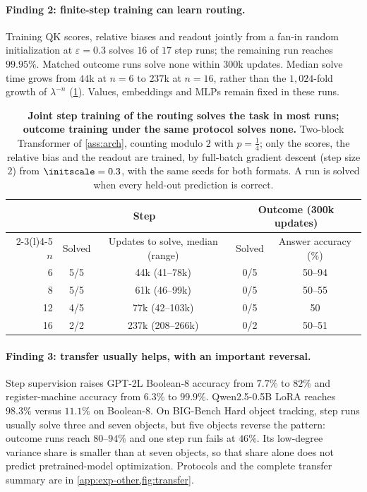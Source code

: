 \paragraph{Finding 2: finite-step training can learn routing.}
Training QK scores, relative biases and readout jointly from a fan-in random initialization
at $\varepsilon=0.3$ solves $16$ of $17$ step runs; the remaining run reaches $99.95\%$.
Matched outcome runs solve none within $300$k updates. Median solve time grows from
$44$k at $n=6$ to $237$k at $n=16$, rather than the $1{,}024$-fold growth of $\lambda^{-n}$
(\cref{tab:reach}). Values, embeddings and MLPs remain fixed in these runs.

\begin{table}[t]
\caption{\textbf{Joint step training of the routing solves the task in most runs; outcome training under the same protocol solves
none.} Two-block Transformer of \cref{ass:arch}, counting modulo $2$ with $p=\tfrac{1}{4}$; only the scores, the relative bias and the
readout are trained, by full-batch gradient descent (step size $2$) from $\initscale=0.3$, with the same seeds for both formats. A run is
solved when every held-out prediction is correct.}
\label{tab:reach}
\centering\small
\begin{tabular}{@{}rcccc@{}}
\toprule
 & \multicolumn{2}{c}{Step} & \multicolumn{2}{c}{Outcome (300k updates)}\\
\cmidrule(lr){2-3}\cmidrule(l){4-5}
$n$ & Solved & Updates to solve, median (range) & Solved & Answer accuracy (\%)\\
\midrule
6  & 5/5 & 44k (41--78k)   & 0/5 & 50--94\\
8  & 5/5 & 61k (46--99k)   & 0/5 & 50--55\\
12 & 4/5 & 77k (42--103k)  & 0/5 & 50\\
16 & 2/2 & 237k (208--266k) & 0/2 & 50--51\\
\bottomrule
\end{tabular}
\end{table}

\paragraph{Finding 3: transfer usually helps, with an important reversal.}
Step supervision raises GPT-2L Boolean-8 accuracy from $7.7\%$ to $82\%$ and register-machine
accuracy from $6.3\%$ to $99.9\%$. Qwen2.5-0.5B LoRA reaches $98.3\%$ versus $11.1\%$
on Boolean-8. On BIG-Bench Hard object tracking, step runs usually solve three and seven
objects, but five objects reverse the pattern: outcome runs reach $80$--$94\%$ and one
step run fails at $46\%$. Its low-degree variance share is smaller than at seven objects,
so that share alone does not predict pretrained-model optimization. Protocols and the
complete transfer summary are in \cref{app:exp-other,fig:transfer}.

